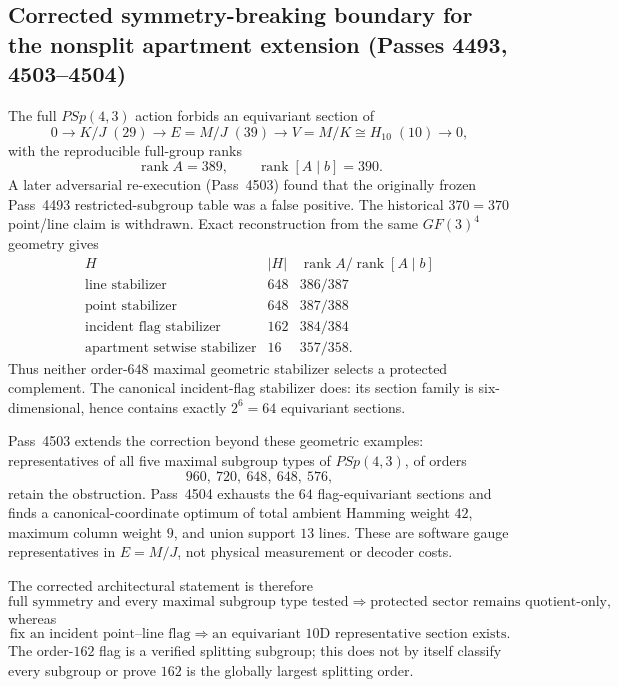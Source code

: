 \subsection{Corrected symmetry-breaking boundary for the nonsplit apartment extension (Passes 4493, 4503--4504)}
\label{sec:pass4493-symmetry-breaking-section}

The full $PSp(4,3)$ action forbids an equivariant section of
\[
0\to K/J\;(29)\to E=M/J\;(39)\to V=M/K\cong H_{10}\;(10)\to0,
\]
with the reproducible full-group ranks
\[
\operatorname{rank}A=389,\qquad\operatorname{rank}[A\mid b]=390.
\]
A later adversarial re-execution (Pass~4503) found that the originally frozen
Pass~4493 restricted-subgroup table was a false positive.  The historical
$370=370$ point/line claim is withdrawn.  Exact reconstruction from the same
$GF(3)^4$ geometry gives
\[
\begin{array}{c|c|c}
H & |H| & \operatorname{rank}A/\operatorname{rank}[A\mid b]\\ \hline
\text{line stabilizer} &648&386/387\\
\text{point stabilizer}&648&387/388\\
\text{incident flag stabilizer}&162&384/384\\
\text{apartment setwise stabilizer}&16&357/358.
\end{array}
\]
Thus neither order-$648$ maximal geometric stabilizer selects a protected
complement.  The canonical incident-flag stabilizer does: its section family is
six-dimensional, hence contains exactly $2^6=64$ equivariant sections.

Pass~4503 extends the correction beyond these geometric examples: representatives
of all five maximal subgroup types of $PSp(4,3)$, of orders
\[
960,\ 720,\ 648,\ 648,\ 576,
\]
retain the obstruction.  Pass~4504 exhausts the $64$ flag-equivariant sections
and finds a canonical-coordinate optimum of total ambient Hamming weight $42$,
maximum column weight $9$, and union support $13$ lines.  These are software
gauge representatives in $E=M/J$, not physical measurement or decoder costs.

The corrected architectural statement is therefore
\[
\boxed{\text{full symmetry and every maximal subgroup type tested}\Rightarrow
\text{protected sector remains quotient-only},}
\]
whereas
\[
\boxed{\text{fix an incident point--line flag}\Rightarrow
\text{an equivariant 10D representative section exists}.}
\]
The order-$162$ flag is a verified splitting subgroup; this does not by itself
classify every subgroup or prove $162$ is the globally largest splitting order.
